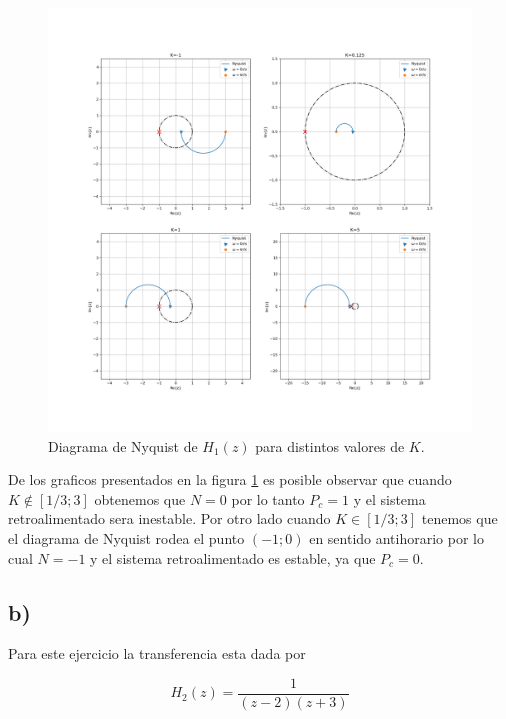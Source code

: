 \documentclass{article}
\begin{document}
            \begin{figure}[!htb]
                \centering
                \includegraphics[width=\textwidth]{Img/8-a}
                \caption{Diagrama de Nyquist de $H_1(z)$ para distintos valores de $K$.}
                \label{fig:8-a}
            \end{figure}

            De los graficos presentados en la figura \ref{fig:8-a} es posible observar que cuando $K \notin [1/3;3]$ obtenemos que $N=0$ por lo 
            tanto $P_c=1$ y el sistema retroalimentado sera inestable. Por otro lado cuando $K \in [1/3 ;3]$ tenemos que el diagrama de Nyquist 
            rodea el punto $(-1;0)$ en sentido antihorario por lo cual $N=-1$ y el sistema retroalimentado es estable, ya que $P_c=0$.

        \subsection{b)}

            Para este ejercicio la transferencia esta dada por 

            \begin{equation}
                H_2(z) = \frac{1}{(z-2)(z+3)}
            \end{equation}
            
\end{document}
